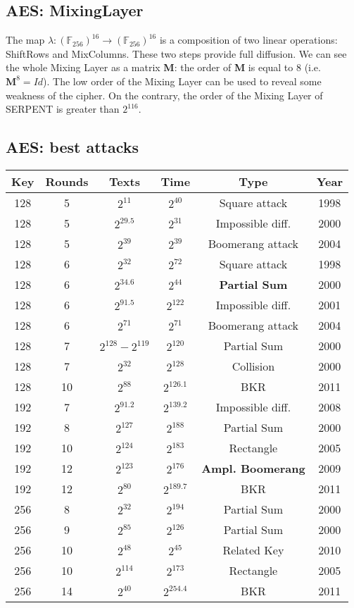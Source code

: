 \documentclass[a4paper, 10pt, titlepage]{article}
\begin{document}
\subsection{AES: MixingLayer}
The map $\lambda: (\mathbb{F}_{256})^{16} \rightarrow (\mathbb{F}_{256})^{16}$ is a composition of two linear operations: ShiftRows and MixColumns. These two steps provide full diffusion. We can see the whole Mixing Layer as a matrix \textbf{M}: the order of \textbf{M} is equal to 8 (i.e. $\textbf{M}^8 = Id$). The low order of the Mixing Layer can be used to reveal some weakness of
the cipher. On the contrary, the order of the Mixing Layer of SERPENT is greater than $2^{116}$.

\subsection{AES: best attacks}
\begin{tabular}{|c||c|c|c|c|c|} \hline
Key & Rounds & Texts & Time & Type & Year \\ \hline
128 & 5 & $2^{11}$ & $2^{40}$ & Square attack & 1998 \\
128 & 5 & $2^{29.5}$ & $2^{31}$ & Impossible diff. & 2000 \\
128 & 5 & $2^{39}$ & $2^{39}$ & Boomerang attack & 2004 \\
128 & 6 & $2^{32}$ & $2^{72}$ & Square attack & 1998 \\
128 & 6 & $2^{34.6}$ & $2^{44}$ & \textbf{Partial Sum} & 2000 \\
128 & 6 & $2^{91.5}$ & $2^{122}$ & Impossible diff. & 2001 \\
128 & 6 & $2^{71}$ & $2^{71}$ & Boomerang attack & 2004 \\
128 & 7 & $2^{128} - 2^{119}$ & $2^{120}$ & Partial Sum & 2000 \\
128 & 7 & $2^{32}$ & $2^{128}$ & Collision & 2000 \\
128 & 10 & $2^{88}$ & $2^{126.1}$ & BKR & 2011 \\ 
\hline
192 & 7 & $2^{91.2}$ & $2^{139.2}$ & Impossible diff. & 2008 \\
192 & 8 & $2^{127}$ & $2^{188}$ & Partial Sum & 2000 \\
192 & 10 & $2^{124}$ & $2^{183}$ & Rectangle & 2005 \\
192 & 12 & $2^{123}$ & $2^{176}$ & \textbf{Ampl. Boomerang} & 2009 \\
192 & 12 & $2^{80}$ & $2^{189.7}$ & BKR & 2011 \\ 
\hline
256 & 8 & $2^{32}$ & $2^{194}$ & Partial Sum & 2000 \\
256 & 9 & $2^{85}$ & $2^{126}$ & Partial Sum & 2000 \\ 
256 & 10 & $2^{48}$ & $2^{45}$ & Related Key & 2010 \\
256 & 10 & $2^{114}$ & $2^{173}$ & Rectangle & 2005 \\
256 & 14 & $2^{40}$ & $2^{254.4}$ & BKR & 2011 \\ \hline
\end{tabular} \medskip\\
\end{document}
